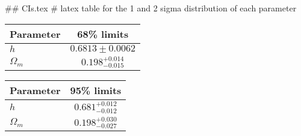 ## CIs.tex
# latex table for the 1 and 2 sigma distribution of each parameter

\begin{tabular} { l  c}
 Parameter &  68\% limits\\
\hline
{\boldmath$h              $} & $0.6813\pm 0.0062          $\\
{\boldmath$\Omega_m       $} & $0.198^{+0.014}_{-0.015}   $\\
\hline
\end{tabular}

\begin{tabular} { l  c}
 Parameter &  95\% limits\\
\hline
{\boldmath$h              $} & $0.681^{+0.012}_{-0.012}   $\\
{\boldmath$\Omega_m       $} & $0.198^{+0.030}_{-0.027}   $\\
\hline
\end{tabular}

